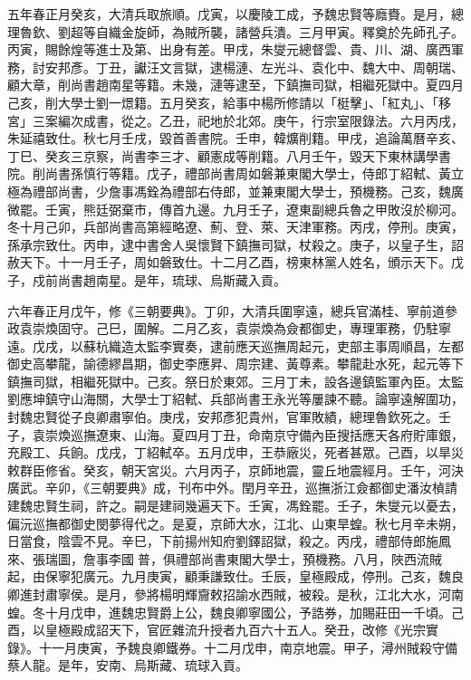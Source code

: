 五年春正月癸亥，大清兵取旅順。戊寅，以慶陵工成，予魏忠賢等廕賚。是月，總理魯欽、劉超等自織金旋師，為賊所襲，諸營兵潰。三月甲寅。釋奠於先師孔子。丙寅，賜餘煌等進士及第、出身有差。甲戌，朱燮元總督雲、貴、川、湖、廣西軍務，討安邦彥。丁丑，讞汪文言獄，逮楊漣、左光斗、袁化中、魏大中、周朝瑞、顧大章，削尚書趙南星等籍。未幾，漣等逮至，下鎮撫司獄，相繼死獄中。夏四月己亥，削大學士劉一燝籍。五月癸亥，給事中楊所修請以「梃擊」、「紅丸」、「移宮」三案編次成書，從之。乙丑，祀地於北郊。庚午，行宗室限錄法。六月丙戌，朱延禧致仕。秋七月壬戌，毀首善書院。壬申，韓爌削籍。甲戌，追論萬曆辛亥、丁巳、癸亥三京察，尚書李三才、顧憲成等削籍。八月壬午，毀天下東林講學書院。削尚書孫慎行等籍。戊子，禮部尚書周如磐兼東閣大學士，侍郎丁紹軾、黃立極為禮部尚書，少詹事馮銓為禮部右侍郎，並兼東閣大學士，預機務。己亥，魏廣微罷。壬寅，熊廷弼棄市，傳首九邊。九月壬子，遼東副總兵魯之甲敗沒於柳河。冬十月己卯，兵部尚書高第經略遼、薊、登、萊、天津軍務。丙戌，停刑。庚寅，孫承宗致仕。丙申，逮中書舍人吳懷賢下鎮撫司獄，杖殺之。庚子，以皇子生，詔赦天下。十一月壬子，周如磐致仕。十二月乙酉，榜東林黨人姓名，頒示天下。戊子，戍前尚書趙南星。是年，琉球、烏斯藏入貢。

六年春正月戊午，修《三朝要典》。丁卯，大清兵圍寧遠，總兵官滿桂、寧前道參政袁崇煥固守。己巳，圍解。二月乙亥，袁崇煥為僉都御史，專理軍務，仍駐寧遠。戊戌，以蘇杭織造太監李實奏，逮前應天巡撫周起元，吏部主事周順昌，左都御史高攀龍，諭德繆昌期，御史李應昇、周宗建、黃尊素。攀龍赴水死，起元等下鎮撫司獄，相繼死獄中。己亥。祭日於東郊。三月丁未，設各邊鎮監軍內臣。太監劉應坤鎮守山海關，大學士丁紹軾、兵部尚書王永光等屢諫不聽。論寧遠解圍功，封魏忠賢從子良卿肅寧伯。庚戌，安邦彥犯貴州，官軍敗績，總理魯欽死之。壬子，袁崇煥巡撫遼東、山海。夏四月丁丑，命南京守備內臣搜括應天各府貯庫銀，充殿工、兵餉。戊戌，丁紹軾卒。五月戊申，王恭廠災，死者甚眾。己酉，以旱災敕群臣修省。癸亥，朝天宮災。六月丙子，京師地震，靈丘地震經月。壬午，河決廣武。辛卯，《三朝要典》成，刊布中外。閏月辛丑，巡撫浙江僉都御史潘汝楨請建魏忠賢生祠，許之。嗣是建祠幾遍天下。壬寅，馮銓罷。壬子，朱燮元以憂去，偏沅巡撫都御史閔夢得代之。是夏，京師大水，江北、山東旱蝗。秋七月辛未朔，日當食，陰雲不見。辛巳，下前揚州知府劉鐸詔獄，殺之。丙戌，禮部侍郎施鳳來、張瑞圖，詹事李國普，俱禮部尚書東閣大學士，預機務。八月，陜西流賊起，由保寧犯廣元。九月庚寅，顧秉謙致仕。壬辰，皇極殿成，停刑。己亥，魏良卿進封肅寧侯。是月，參將楊明輝齎敕招諭水西賊，被殺。是秋，江北大水，河南蝗。冬十月戊申，進魏忠賢爵上公，魏良卿寧國公，予誥券，加賜莊田一千頃。己酉，以皇極殿成詔天下，官匠雜流升授者九百六十五人。癸丑，改修《光宗實錄》。十一月庚寅，予魏良卿鐵券。十二月戊申，南京地震。甲子，潯州賊殺守備蔡人龍。是年，安南、烏斯藏、琉球入貢。

